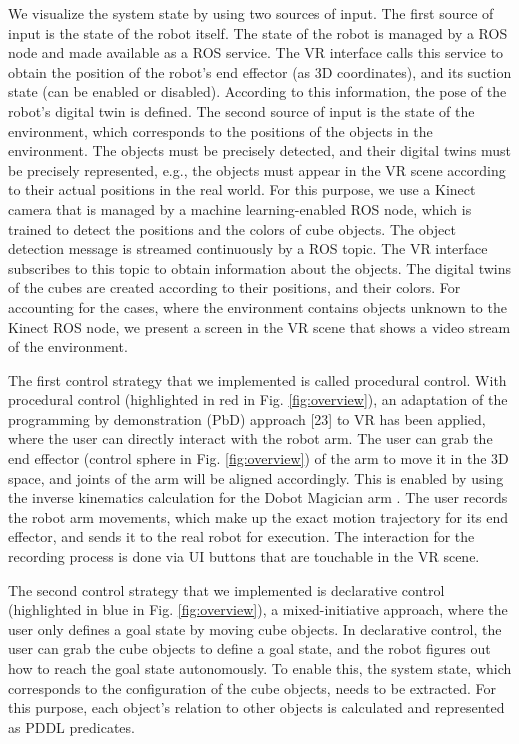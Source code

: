 \documentclass[10pt, conference]{IEEEtran}
\begin{document}
We visualize the system state by using two sources of input. The first source of input is the state of the robot itself. The state of the robot is managed by a ROS node and made available as a ROS service. The VR interface calls this service to obtain the position of the robot's end effector (as 3D coordinates), and its suction state (can be enabled or disabled). According to this information, the pose of the robot's digital twin is defined. The second source of input is the state of the environment, which corresponds to the positions of the objects in the environment. The objects must be precisely detected, and their digital twins must be precisely represented, e.g., the objects must appear in the VR scene according to their actual positions in the real world. For this purpose, we use a Kinect camera that is managed by a machine learning-enabled ROS node, which is trained to detect the positions and the colors of cube objects. The object detection message is streamed continuously by a ROS topic. The VR interface subscribes to this topic to obtain information about the objects. The digital twins of the cubes are created according to their positions, and their colors. For accounting for the cases, where the environment contains objects unknown to the Kinect ROS node, we present a screen in the VR scene that shows a video stream of the environment.

The first control strategy that we implemented is called procedural control. With procedural control (highlighted in red in Fig. \ref{fig:overview}), an  adaptation of the programming  by  demonstration  (PbD) approach [23]  to VR has been applied, where the user can directly  interact  with  the  robot  arm. The user can grab the end effector (control sphere in Fig. \ref{fig:overview}) of the arm to move it in the 3D space, and joints of the arm will be aligned accordingly. This is enabled by using the inverse kinematics calculation for the Dobot Magician arm \cite{dobot_ik_2017}. The user records the robot arm movements, which make up the exact motion trajectory for its end effector, and sends it to the real robot for execution. The interaction for the recording process is done via UI buttons that are touchable in the VR scene.

The second control strategy that we implemented is declarative control (highlighted in blue in Fig. \ref{fig:overview}), a mixed-initiative approach, where the user only defines a goal state by moving cube objects. In declarative control, the user can grab the cube objects to define a goal state, and the robot figures out how to reach the goal state autonomously. To enable this, the system state, which corresponds to the configuration of the cube objects, needs to be extracted. For this purpose, each object's relation to other objects is calculated and represented as PDDL predicates.
\end{document}
